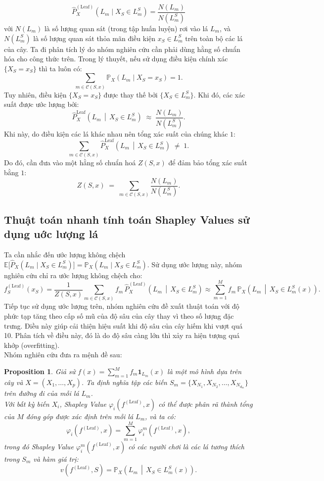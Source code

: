 \documentclass[12pt, a4paper]{article}
\theoremstyle{plain}
\theoremstyle{proposition}
\newtheorem{proposition}{Proposition}[section]
\theoremstyle{lemma}
\begin{document}
\[
\hat{P}^{(\text{Leaf})}_X(L_m \mid X_S \in L^S_m) 
= \frac{N(L_m)}{N(L^S_m)}
\]
với \(N(L_m)\) là số lượng quan sát (trong tập huấn luyện) rơi vào lá \(L_m\), và \(N(L^S_m)\) là số lượng quan sát 
thỏa mãn điều kiện \(x_S \in L^S_m\) trên toàn bộ các lá của cây.
Ta đi phân tích lý do nhóm nghiên cứu cần phải dùng hằng số chuẩn hóa cho công thức trên. Trong lý thuyết, nếu sử dụng điều kiện chính xác $\{X_S = x_S\}$ thì ta luôn có:
\[
\sum_{m \in \mathcal{C}(S, x)} \mathbb{P}_X(L_m \mid X_S = x_S) = 1.
\]
Tuy nhiên, điều kiện $\{X_S = x_S\}$ được thay thế bởi
$\{X_S \in L_m^S\}$. Khi đó, các xác suất được ước lượng bởi:
\[
\hat{P}^{\text{Leaf}}_X\!\left(L_m \,\middle|\, X_S \in L^S_m\right) \;\approx\; \frac{N(L_m)}{N(L_m^S)}.
\]
Khi này, do điều kiện các lá khác nhau nên tổng xác suất của chúng khác $1$:
\[
\sum_{m \in \mathcal{C}(S,x)} \hat{P}^{\text{Leaf}}_X\!\left(L_m \,\middle|\, X_S \in L^S_m\right) \;\neq\; 1.
\]
Do đó, cần đưa vào một hằng số chuẩn hoá $Z(S,x)$ để đảm bảo tổng xác suất bằng $1$:
\[
Z(S, x) \;=\; \sum_{m \in \mathcal{C}(S,x)} \frac{N(L_m)}{N(L_m^S)}.
\]
\subsection{Thuật toán nhanh tính toán Shapley Values sử dụng uớc lượng lá}
Ta cần nhắc đến ước lượng không chệch $\mathbb{E}\big[\widehat{P}_X(L_m \mid X_S \in L_m^S)\big] = \mathbb{P}_X(L_m \mid X_S \in L_m^S).$ Sử dụng ước lượng này, nhóm nghiên cứu chỉ ra ước lượng không chệch cho:
\[
f^{(\text{Leaf})}_S(x_S) 
= \frac{1}{Z(S,x)} \sum_{m \in \mathcal{C}(S,x)} 
f_m \, \widehat{P}^{(\text{Leaf})}_X \!\left( L_m \,\middle|\, X_S \in L_m^S \right) 
\approx \sum_{m=1}^{M} f_m \, \mathbb{P}_X \!\left( L_m \,\middle|\, X_S \in L_m^S(x) \right).
\]
Tiếp tục sử dụng ước lượng trên, nhóm nghiên cứu đề xuất thuật toán với độ phức tạp tăng theo cấp số mũ của độ sâu của cây thay vì theo số lượng đặc trưng. Điều này giúp cải thiện hiệu suất khi độ sâu của cây hiếm khi vượt quá 10. Phân tích về điều này, đó là do độ sâu càng lớn thì xảy ra hiện tượng quá khớp (overfitting). \\
Nhóm nghiên cứu đưa ra mệnh đề sau:  \\
\begin{proposition}
    
Giả sử $f(x) = \sum_{m=1}^{M} f_m \mathbf{1}_{L_m}(x)$ là một mô hình dựa trên cây và $X = (X_1, \dots, X_p)$. 
Ta định nghĩa tập các biến $S_m = \{X_{N_1}, X_{N_2}, \dots, X_{N_{d_m}}\}$ 
trên đường đi của mỗi lá $L_m$. \\
Với bất kỳ biến $X_i$, Shapley Value $\varphi_i\!\left(f^{(\text{Leaf})}, x\right)$ 
có thể được phân rã thành tổng của $M$ đóng góp được xác định trên mỗi lá $L_m$, và ta có:
\[
\varphi_i\!\left(f^{(\text{Leaf})}, x\right) 
= \sum_{m=1}^{M} \varphi_i^m\!\left(f^{(\text{Leaf})}, x\right),
\]
trong đó Shapley Value $\varphi_i^m\!\left(f^{(\text{Leaf})}, x\right)$ có các người chơi là các lá tương thích trong $S_m$ và hàm giá trị:
\[
v\!\left(f^{(\text{Leaf})}, S\right) 
= \mathbb{P}_X\!\left(L_m \,\middle|\, X_S \in L_m^S(x)\right).
\]
\end{proposition}
\end{document}
